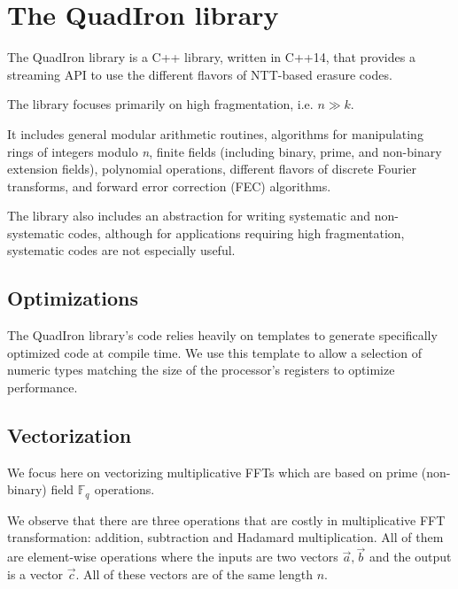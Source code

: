 \documentclass[oneside,9pt]{article}
\newcommand{\gf}[2][]{ \mathbb{F}_{{#2}^{#1}} }
\begin{document}
\section{The QuadIron library}

The QuadIron library is a C++ library, written in C++14, that provides a streaming API to use the different flavors of NTT-based erasure codes.

The library focuses primarily on high fragmentation, i.e. $n \gg k$.

It includes general modular arithmetic routines, algorithms for manipulating rings of integers modulo \textit{n}, finite fields (including binary, prime, and non-binary extension fields), polynomial operations, different flavors of discrete Fourier transforms, and forward error correction (FEC) algorithms.
% 
% 
% 
% 

The library also includes an abstraction for writing systematic and non-systematic codes, although for applications requiring high fragmentation, systematic codes are not especially useful.

\subsection{Optimizations}

The QuadIron library's code relies heavily on templates to generate specifically optimized code at compile time. We use this template to allow a selection of numeric types matching the size of the processor's registers to optimize performance.

\subsection{Vectorization} \label{sec:vectorization}

We focus here on vectorizing multiplicative FFTs which are based on prime (non-binary) field $\gf{q}$ operations.

We observe that there are three operations that are costly in multiplicative FFT transformation: addition, subtraction and Hadamard multiplication. All of them are element-wise operations where the inputs are two vectors $\vec{a}, \vec{b}$ and the output is a vector $\vec{c}$. All of these vectors are of the same length $n$.
\end{document}
